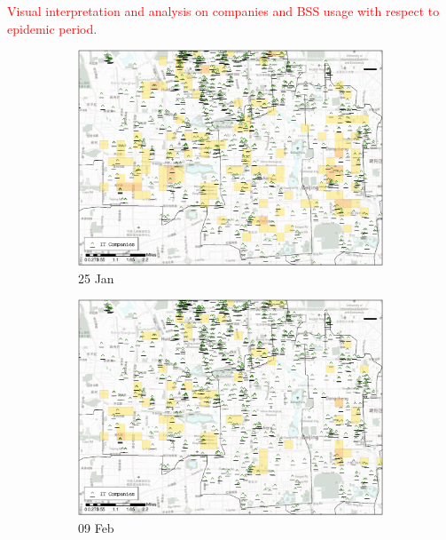 \documentclass[preprints,ijgi,submit,moreauthors]{Definitions/mdpi}
\begin{document}
\textcolor{red}{Visual interpretation and analysis on companies and BSS usage with respect to epidemic period.}
\begin{figure}[H]
    \centering
    \begin{subfigure}{.23\textwidth}
        \includegraphics[width=\textwidth]{Figures/Figure10/POI_compD2020_01_25.eps}
        \caption{25 Jan}
    \end{subfigure}
    \begin{subfigure}{.23\textwidth}
        \includegraphics[width=\textwidth]{Figures/Figure10/POI_compD2020_02_09.eps}
        \caption{09 Feb}
    \end{subfigure}
    \begin{subfigure}{.23\textwidth}

\end{subfigure}
\end{figure}
\end{document}
